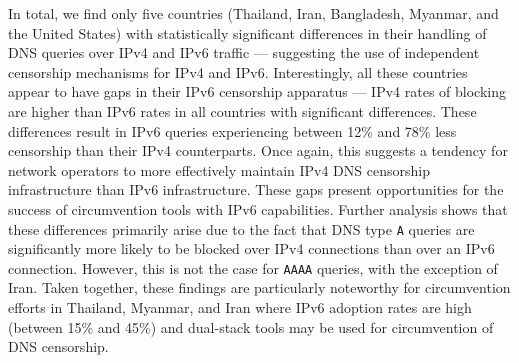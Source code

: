 %
In total, we find only five countries (Thailand, Iran, Bangladesh, Myanmar, and
the United States) with statistically significant differences in their handling
of DNS queries over IPv4 and IPv6 traffic --- suggesting the use of independent
censorship mechanisms for IPv4 and IPv6. 
%
Interestingly, all these countries appear to have gaps in their IPv6 censorship
apparatus --- \ie IPv4 rates of blocking are higher than IPv6 rates in all
countries with significant differences. These differences result in IPv6
queries experiencing between 12\% and 78\% less censorship than their IPv4
counterparts.
%
Once again, this suggests a tendency for network operators to more effectively
maintain IPv4 DNS censorship infrastructure than IPv6 infrastructure. These
gaps present opportunities for the success of circumvention tools with IPv6
capabilities.  
%
Further analysis shows that these differences primarily arise due to the fact
that DNS type {\tt A} queries are significantly more likely to be blocked over
IPv4 connections than over an IPv6 connection. However, this is not the case
for {\tt AAAA} queries, with the exception of Iran.
%
Taken together, these findings are particularly noteworthy for circumvention
efforts in Thailand, Myanmar, and Iran where IPv6 adoption rates are high
(between 15\% and 45\%) and dual-stack tools may be used for circumvention of
DNS censorship.
%

